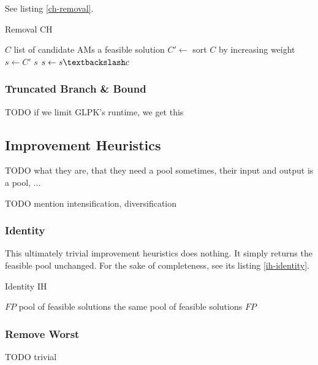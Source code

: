 \documentclass[a4paper,12pt,oneside]{report}
\begin{document}
See listing \ref{ch-removal}.

\begin{algorithm}
\caption{Removal CH}
\label{ch-removal}
\begin{algorithmic}
\REQUIRE $C$ list of candidate AMs
\ENSURE a feasible solution
\STATE $C' \gets $ sort $C$ by increasing weight
\STATE $s \gets C'$
    \RETURN $s$
  \ENDIF
  \STATE $s \gets s \textbackslash c$
\ENDFOR
\end{algorithmic}
\end{algorithm}

\subsubsection{Truncated Branch \& Bound}

TODO if we limit GLPK's runtime, we get this 

\subsection{Improvement Heuristics}


TODO what they are, that they need a pool sometimes, their input and output is a pool, ...

TODO mention intensification, diversification

\subsubsection{Identity}

This ultimately trivial improvement heuristics does nothing. It simply returns the feasible pool unchanged. For the sake of completeness, see its listing \ref{ih-identity}.

\begin{algorithm}
\caption{Identity IH}
\label{ih-identity}
\begin{algorithmic}
\REQUIRE $FP$ pool of feasible solutions
\ENSURE the same pool of feasible solutions
\RETURN $FP$
\end{algorithmic}
\end{algorithm}

\subsubsection{Remove Worst}

TODO trivial
\end{document}

